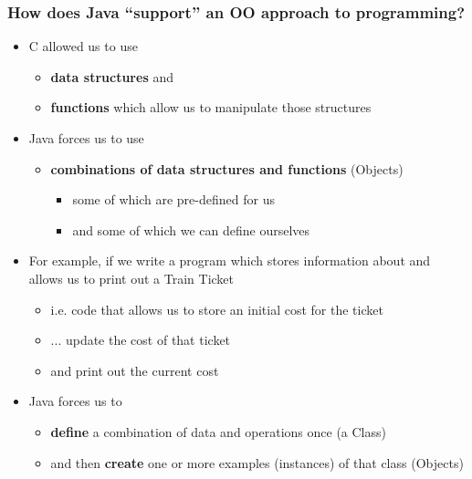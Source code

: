 \documentclass{beamer}
\begin{document}
\begin{frame}
\frametitle{How does Java ``support'' an OO approach to programming?}
\begin{itemize}
\item C allowed us to use 
\begin{itemize}
\item \textbf{data structures} and 
\item \textbf{functions} which allow us to manipulate those structures
\end{itemize}
\item Java forces us to use 

\begin{itemize}
\item \textbf{combinations of data structures and functions} (\alert{Objects})

\begin{itemize}
\item some of which are pre-defined for us
\item and some of which we can define ourselves
\end{itemize}
\end{itemize}
\end{itemize}\end{frame}


\begin{frame}
\begin{itemize}
\item For example, if we write a program which stores information about and allows us to print out a Train Ticket
\begin{itemize}
\item i.e. code that  allows us to store an initial cost for the ticket
\item ... update the cost of that ticket
\item and print out the current cost
\end{itemize}
\end{itemize}
\end{frame}


\begin{frame}
\begin{itemize}
\item Java forces us to 
\begin{itemize}
\item \textbf{define} a combination of data and operations once (a \alert{Class})
\item and then \textbf{create} one or more examples (instances) of that class (\alert{Objects})
\end{itemize}
\end{itemize}
\end{frame}
\end{document}
